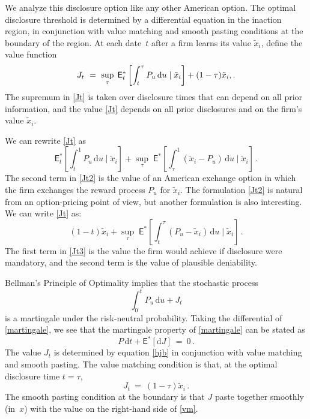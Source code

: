 \documentclass[ecta,nameyear,draft]{econsocart}
\theoremstyle{theorem}
\numberwithin{lemma}{section}
\numberwithin{proposition}{section}
\numberwithin{equation}{section}
\numberwithin{figure}{section}
\newcommand{\D}{\mathrm{d}}
\newcommand{\mye}{\ensuremath{\mathsf{E}}}
\begin{document}
We analyze this disclosure option like any other American option. The optimal disclosure threshold is determined by a differential equation in the inaction region, in conjunction with value matching and smooth pasting conditions at the boundary of the region.     At each date~$t$ after a firm learns its value $\tilde x_i$, define the value function
\begin{equation}\label{Jt}
J_t \ = \  \sup_\tau \; \mye^*_t \left[\int_t^\tau P_u \,\D u \mid \tilde x_i \right] + (1-\tau)\tilde x_i\\,.
\end{equation}
The supremum in \eqref{Jt} is taken over disclosure times that can depend on all prior information, and the value \eqref{Jt} depends on all prior disclosures and on the firm's value $\tilde x_i$.  

We can rewrite \eqref{Jt} as
\begin{equation}\label{Jt2}
\mye^*_t\left[ \int_t^1 P_u \,\D u \mid \tilde x_i \right] + \sup_\tau \; \mye^*\left[\int_\tau^1(\tilde x_i - P_u)\,\D u \mid \tilde x_i\right]\,.
\end{equation}
The second term in \eqref{Jt2} is the value of an American exchange option in which the firm exchanges the reward process $P_u$ for $\tilde x_i$.  The formulation \eqref{Jt2} is natural from an option-pricing point of view, but another formulation is also interesting.  We can  write \eqref{Jt} as:
\begin{equation}\label{Jt3}
(1-t)\tilde x_i + \sup_\tau \; \mye^*\left[\int_t^\tau (P_u-\tilde x_i )\,\D u\mid \tilde x_i\right]\,.
\end{equation}
The first term in \eqref{Jt3} is the value the firm would achieve if disclosure were mandatory, and the second term is the value of plausible deniability.

Bellman's Principle of Optimality implies that the stochastic process
\begin{equation}\label{martingale}
\int_0^t P_u\,\D u + J_t
\end{equation}
is a martingale under the risk-neutral probability.
Taking the differential of \eqref{martingale}, we see that the martingale property of \eqref{martingale} can be stated as
\begin{equation}\label{hjb}
P\,\D t + \mye^*[\D J] \ = \ 0\,.
\end{equation}
The value $J_t$ is determined by equation \eqref{hjb} in conjunction with value matching and smooth pasting. 
The value matching condition is that, at the optimal disclosure time $t=\tau$,
\begin{equation}\label{vm}
J_t \ = \ (1-\tau)\tilde x_i\,.
\end{equation} 
The smooth pasting condition at the boundary is that $J$ paste together smoothly (in~$x$) with the value on the right-hand side of \eqref{vm}. 
\end{document}
